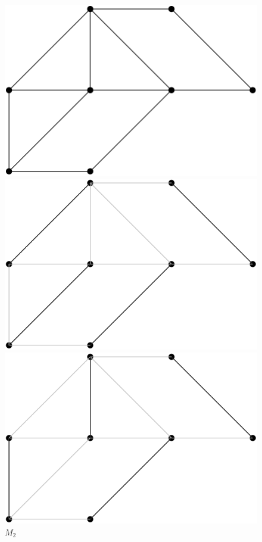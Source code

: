 \documentclass[12pt]{article}
\begin{document}
\begin{figure}[H]
    \centering
    \includegraphics[scale = 0.5]{images/G_example.png}
    \caption{$G$}
    \includegraphics[scale = 0.4]{images/G_example_M1.png}
    \caption{$M_1$}
    \includegraphics[scale = 0.4]{images/G_example_M2.png}
    \caption{$M_2$}
    
    
\end{figure}
\end{document}
